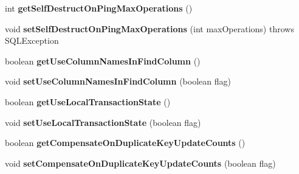 \begin{DoxyCompactItemize}
int {\bfseries get\+Self\+Destruct\+On\+Ping\+Max\+Operations} ()
\item 
\mbox{\label{interfacecom_1_1mysql_1_1jdbc_1_1_connection_properties_af894b569f82db78a2fdc7a2507a51132}} 
void {\bfseries set\+Self\+Destruct\+On\+Ping\+Max\+Operations} (int max\+Operations)  throws S\+Q\+L\+Exception
\item 
\mbox{\label{interfacecom_1_1mysql_1_1jdbc_1_1_connection_properties_a31bcbd65c33f999fcd3109d6277a883e}} 
boolean {\bfseries get\+Use\+Column\+Names\+In\+Find\+Column} ()
\item 
\mbox{\label{interfacecom_1_1mysql_1_1jdbc_1_1_connection_properties_a093829281c18fd48a0625ad2a8bd980e}} 
void {\bfseries set\+Use\+Column\+Names\+In\+Find\+Column} (boolean flag)
\item 
\mbox{\label{interfacecom_1_1mysql_1_1jdbc_1_1_connection_properties_a9c9064398ac6bfc233c14d82654748a5}} 
boolean {\bfseries get\+Use\+Local\+Transaction\+State} ()
\item 
\mbox{\label{interfacecom_1_1mysql_1_1jdbc_1_1_connection_properties_a51cd2d5482d6723c15bc3d9ab8b80788}} 
void {\bfseries set\+Use\+Local\+Transaction\+State} (boolean flag)
\item 
\mbox{\label{interfacecom_1_1mysql_1_1jdbc_1_1_connection_properties_a0e1b03c5d82f94bcaa711ed3731e2b18}} 
boolean {\bfseries get\+Compensate\+On\+Duplicate\+Key\+Update\+Counts} ()
\item 
\mbox{\label{interfacecom_1_1mysql_1_1jdbc_1_1_connection_properties_a43489fd2dd356d717b56130119cb113d}} 
void {\bfseries set\+Compensate\+On\+Duplicate\+Key\+Update\+Counts} (boolean flag)
\item 
\mbox{\label{interfacecom_1_1mysql_1_1jdbc_1_1_connection_properties_afd849b2a5adafe6bc3e26c48683a05dc}} 

\end{DoxyCompactItemize}
